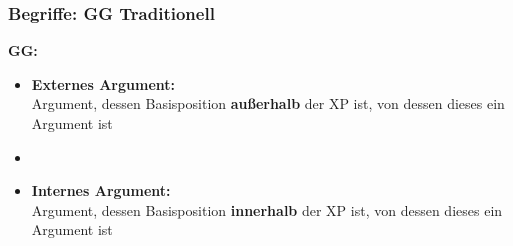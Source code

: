 \begin{frame}
\frametitle{Begriffe: GG \vs Traditionell}

	\begin{minipage}[b]{0.47\textwidth}
		\footnotesize 
	\textbf{GG:}
		\begin{itemize}
		\item \alert{\textbf{Externes Argument:}}\\
		Argument, dessen Basisposition \textbf{außerhalb} der XP ist, von dessen  dieses ein Argument ist
		\item[]
		\item \textbf{Internes Argument:}\\
		Argument, dessen Basisposition \textbf{innerhalb} der XP ist, von dessen  dieses ein Argument ist
		\end{itemize}	
  	\end{minipage}  
	\begin{minipage}[b]{0.48\textwidth}
		\begin{figure}
	\centering
	\end{figure}
  	\end{minipage}    

\end{frame}


